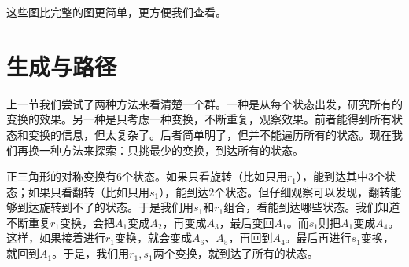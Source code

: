 \documentclass[12pt,UTF8,fontset=none]{ctexbook}
\begin{document}
这些图比完整的图更简单，更方便我们查看。

\section{生成与路径}

上一节我们尝试了两种方法来看清楚一个群。一种是从每个状态出发，研究所有的变换的效果。另一种是只考虑一种变换，不断重复，观察效果。前者能得到所有状态和变换的信息，但太复杂了。后者简单明了，但并不能遍历所有的状态。现在我们再换一种方法来探索：只挑最少的变换，到达所有的状态。

正三角形的对称变换有$6$个状态。如果只看旋转（比如只用$r_1$），能到达其中$3$个状态；如果只看翻转（比如只用$s_1$），能到达$2$个状态。但仔细观察可以发现，翻转能够到达旋转到不了的状态。于是我们用$s_1$和$r_1$组合，看能到达哪些状态。我们知道不断重复$r_1$变换，会把$A_1$变成$A_2$，再变成$A_3$，最后变回$A_1$。而$s_1$则把$A_1$变成$A_4$。这样，如果接着进行$r_1$变换，就会变成$A_6$、$A_5$，再回到$A_4$。最后再进行$s_1$变换，就回到$A_1$。于是，我们用$r_1,s_1$两个变换，就到达了所有的状态。
\end{document}
